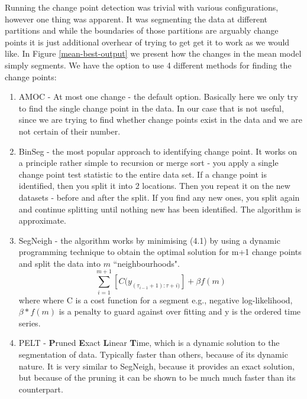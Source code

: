 \documentclass[minf,twoside,singlespacing,parskip,notimes,deptreport]{infthesis} %
\begin{document}
Running the change point detection was trivial with various configurations, however one thing was apparent. It was segmenting the data at different partitions and while the boundaries of those partitions are arguably change points it is just additional overhear of trying to get get it to work as we would like. In Figure \ref{mean-best-output} we present how the changes in the mean model simply segments. We have the option to use 4 different methods for finding the change points:
\begin{enumerate}
\item AMOC - At most one change - the default option. Basically here we only try to find the single change point in the data. In our case that is not useful, since we are trying to find whether change points exist in the data and we are not certain of their number. 
\item BinSeg - the most popular approach to identifying change point. It works on a principle rather simple to recursion or merge sort - you apply a single change point test statistic to the entire data set. If a change point is identified, then you split it into 2 locations. Then you repeat it on the new datasets - before and after the split. If you find any new ones, you split again and continue splitting until nothing new has been identified. The algorithm is approximate.
\item SegNeigh - the algorithm works by minimising (4.1) by using a dynamic programming technique to obtain the optimal solution for m+1 change points and split the data into $m$ ``neighbourhoods".
\begin{equation}
\sum_{i=1}^{m+1} [ C(y_{(\tau_{i-1}+1):\tau+{i})}] + \beta f(m) 
\end{equation}
where where C is a cost function for a segment e.g., negative log-likelihood, $\beta*f(m)$ is a penalty to guard against over fitting and y is the ordered time series.
\item PELT - \textbf{P}runed \textbf{E}xact \textbf{L}inear \textbf{T}ime, which is a dynamic solution to the segmentation of data. Typically faster than others, because of its dynamic nature. It is very similar to SegNeigh, because it provides an exact solution, but because of the pruning it can be shown to be much much faster than its counterpart. 
\end{enumerate}
\end{document}
